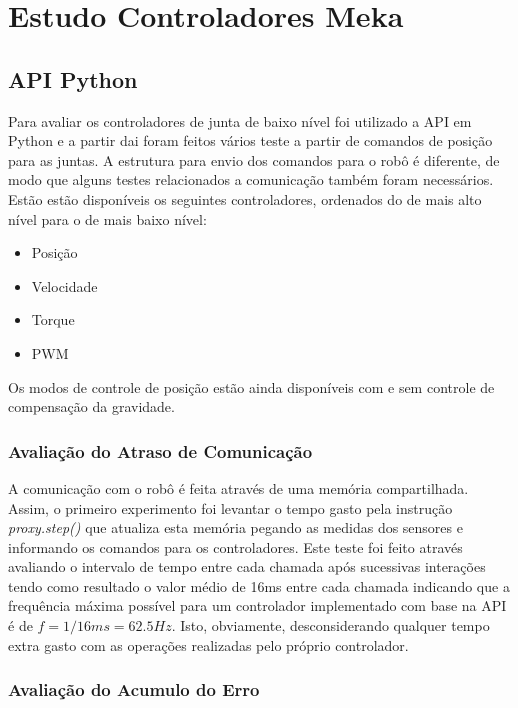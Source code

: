 \section{Estudo Controladores Meka}

\subsection{API Python}

Para avaliar os controladores de junta de baixo nível foi utilizado a API em Python e a partir dai foram feitos vários teste a partir de comandos de posição para as juntas. A estrutura para envio dos comandos para o robô é diferente, de modo que alguns testes relacionados a comunicação também foram necessários. Estão estão disponíveis os seguintes controladores, ordenados do de mais alto nível para o de mais baixo nível:

\begin{itemize}
    \item Posição
    \item Velocidade
    \item Torque
    \item PWM
\end{itemize}

Os modos de controle de posição estão ainda disponíveis com e sem controle de compensação da gravidade.

\subsubsection{Avaliação do Atraso de Comunicação}

A comunicação com o robô é feita através de uma memória compartilhada. Assim, o primeiro experimento foi levantar o tempo gasto pela instrução \textit{proxy.step()} que atualiza esta memória pegando as medidas dos sensores e informando os comandos para os controladores. Este teste foi feito através avaliando o intervalo de tempo entre cada chamada após sucessivas interações tendo como resultado o valor médio de 16ms entre cada chamada indicando que a frequência máxima possível para um controlador implementado com base na API é de $f = 1/16ms = 62.5Hz$. Isto, obviamente, desconsiderando qualquer tempo extra gasto com as operações realizadas pelo próprio controlador.

\subsubsection{Avaliação do Acumulo do Erro}

